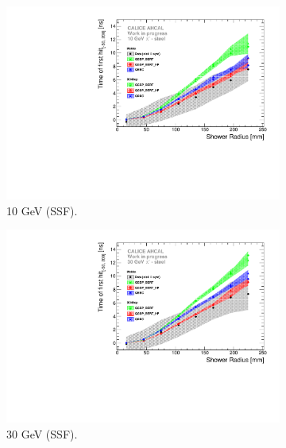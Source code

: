 \begin{figure}[htbp!]
	\begin{subfigure}[t]{0.5\textwidth}
		\centering
		\includegraphics[width=1\textwidth]{../Thesis_Plots/Timing/Pions/Plots/ComparisonToSim/Time_Radius_10GeV_SSF.pdf}
		\caption{10 GeV (SSF).} \label{fig:Radius_SSF_SimData_10GeV}
	\end{subfigure}
	\hfill
	\begin{subfigure}[t]{0.5\textwidth}
		\centering
		\includegraphics[width=1\textwidth]{../Thesis_Plots/Timing/Pions/Plots/ComparisonToSim/Time_Radius_30GeV_SSF.pdf}
		\caption{30 GeV (SSF).} \label{fig:Radius_SSF_SimData_30GeV}
	\end{subfigure}
	\hfill
	\begin{subfigure}[t]{0.5\textwidth}
		\centering

\end{subfigure}
\end{figure}
